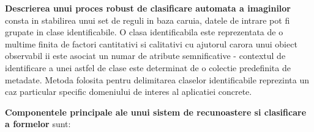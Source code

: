 \documentclass[10pt]{article}
\begin{document}
\> {\bf Descrierea unui proces robust de clasificare automata a imaginilor} consta in
stabilirea unui set de reguli in baza caruia, datele de intrare pot fi grupate in clase
identificabile. O clasa identificabila este reprezentata de o multime finita de factori
cantitativi si calitativi cu ajutorul carora unui obiect observabil ii este asociat un numar de
atribute semnificative - contextul de identificare a unei astfel de clase este determinat de o colectie
predefinita de metadate. Metoda folosita pentru delimitarea claselor identificabile reprezinta un
caz particular specific domeniului de interes al aplicatiei concrete. 

\newpage

\> {\bf Componentele principale ale unui sistem de recunoastere si clasificare a formelor} sunt:
\end{document}

